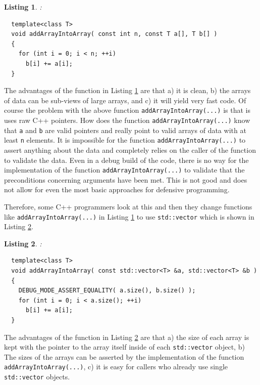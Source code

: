 \documentclass[pdf,ps2pdf,11pt]{SANDreport}
\newtheorem{listing}{Listing}
\begin{document}
\begin{listing}:\\
\label{listing:addArrayIntoArray-raw}
{\small\begin{verbatim}
  template<class T>
  void addArrayIntoArray( const int n, const T a[], T b[] )
  {
    for (int i = 0; i < n; ++i)
      b[i] += a[i];
  }
\end{verbatim}}
\end{listing}

The advantages of the function in Listing
{}\ref{listing:addArrayIntoArray-raw} are that a) it is clean, b) the
arrays of data can be sub-views of large arrays, and c) it will yield
very fast code.  Of course the problem with the above function
{}\texttt{addArrayIntoArray(...)} is that is uses raw C++ pointers.  How
does the function {}\texttt{addArrayIntoArray(...)} know that
{}\texttt{a} and {}\texttt{b} are valid pointers and really point to
valid arrays of data with at least {}\texttt{n} elements.  It is
impossible for the function {}\texttt{addArrayIntoArray(...)} to
assert anything about the data and completely relies on the caller of
the function to validate the data.  Even in a debug build of the code,
there is no way for the implementation of the function
{}\texttt{addArrayIntoArray(...)} to validate that the preconditions
concerning arguments have been met.  This is not good and does not
allow for even the most basic approaches for defensive programming.

Therefore, some C++ programmers look at this and then they change
functions like {}\texttt{addArrayIntoArray(...)} in Listing
{}\ref{listing:addArrayIntoArray-raw} to use {}\texttt{std::vector}
which is shown in Listing
{}\ref{listing:addArrayIntoArray-std-vector}.

\begin{listing}:\\
\label{listing:addArrayIntoArray-std-vector}
{\small\begin{verbatim}
  template<class T>
  void addArrayIntoArray( const std::vector<T> &a, std::vector<T> &b )
  {
    DEBUG_MODE_ASSERT_EQUALITY( a.size(), b.size() );
    for (int i = 0; i < a.size(); ++i)
      b[i] += a[i];
  }
\end{verbatim}}
\end{listing}

The advantages of the function in Listing
{}\ref{listing:addArrayIntoArray-std-vector} are that a) the size of
each array is kept with the pointer to the array itself inside of each
{}\texttt{std::vector} object, b) The sizes of the arrays can be
asserted by the implementation of the function
{}\texttt{addArrayIntoArray(...)}, c) it is easy for callers who
already use single {}\texttt{std::vector} objects.
\end{document}

